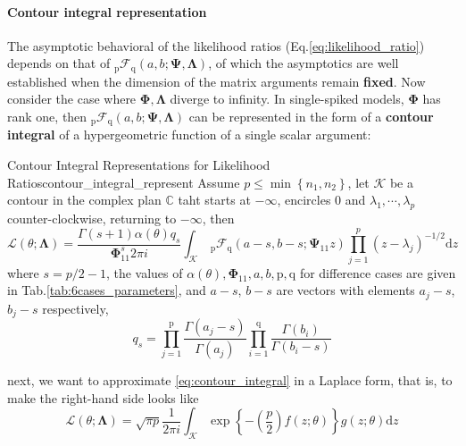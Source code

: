 \documentclass[twoside]{article}
\begin{document}
\paragraph*{Contour integral representation} The asymptotic behavioral of the likelihood ratios (Eq.\ref{eq:likelihood_ratio}) depends on that of $_{\mathrm{p}}\mathcal{F}_{\mathrm{q}}(a,b;\boldsymbol{\Psi},\boldsymbol{\Lambda})$, of which the asymptotics are well established when the dimension of the matrix arguments remain \textbf{fixed}. Now consider the case where $\boldsymbol{\Phi,\Lambda}$ diverge to infinity. In single-spiked models, $\boldsymbol{\Phi}$ has rank one, then $_{\mathrm{p}}\mathcal{F}_{\mathrm{q}}(a,b;\boldsymbol{\Psi},\boldsymbol{\Lambda})$ can be represented in the form of a \textbf{contour integral} of a hypergeometric function of a single scalar argument:

\begin{lemma}{Contour Integral Representations for Likelihood Ratios}{contour_integral_represent}
    Assume $p\leq \min\left\{ n_1,n_2 \right\}$, let $\mathcal{K}$ be a contour in the complex plan $\mathbb{C}$ taht starts at $-\infty$, encircles $0$ and $\lambda_1,\cdots,\lambda_p$ counter-clockwise, returning to $-\infty$, then 
    \begin{equation}\label{eq:contour_integral}
        \mathcal{L}(\theta;\boldsymbol{\Lambda}) = \frac{\Gamma(s+1)\alpha(\theta)q_s}{\boldsymbol{\Phi}^s_{11}2\pi i}\int_{\mathcal{K}}\ _{\mathrm{p}}\mathcal{F}_{\mathrm{q}}(a-s,b-s;\boldsymbol{\Psi}_{11}z)\prod^p_{j=1}(z-\lambda_j)^{-1/2}\mathrm{d}z
    \end{equation}
    where $s=p/2-1$, the values of $\alpha(\theta),\boldsymbol{\Phi}_{11},a,b,\mathrm{p},\mathrm{q}$ for difference cases are given in Tab.\ref{tab:6cases_parameters}, and $a-s$, $b-s$ are vectors with elements $a_j-s$, $b_j-s$ respectively, $$ q_s = \prod^{\mathrm{p}}_{j=1}\frac{\Gamma (a_j-s)}{\Gamma (a_j)} \prod^{\mathrm{q}}_{i=1}\frac{\Gamma (b_i)}{\Gamma (b_i-s)} $$
\end{lemma}

next, we want to approximate \ref{eq:contour_integral} in a Laplace form, that is, to make the right-hand side looks like
\begin{equation}\label{eq:laplace_form}
    \mathcal{L}(\theta;\boldsymbol{\Lambda}) = \sqrt{\pi p}\frac{1}{2\pi i}\int_{\mathcal{K}}\exp\left\{ -\left(\frac{p}{2}\right)f(z;\theta) \right\} g(z;\theta)\mathrm{d}z
\end{equation}
\end{document}
